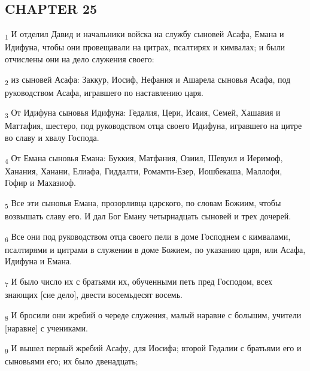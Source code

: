 \subsection{CHAPTER 25}
\begin{tcolorbox}
\textsubscript{1} И отделил Давид и начальники войска на службу сыновей Асафа, Емана и Идифуна, чтобы они провещавали на цитрах, псалтирях и кимвалах; и были отчислены они на дело служения своего:
\end{tcolorbox}
\begin{tcolorbox}
\textsubscript{2} из сыновей Асафа: Заккур, Иосиф, Нефания и Ашарела сыновья Асафа, под руководством Асафа, игравшего по наставлению царя.
\end{tcolorbox}
\begin{tcolorbox}
\textsubscript{3} От Идифуна сыновья Идифуна: Гедалия, Цери, Исаия, Семей, Хашавия и Маттафия, шестеро, под руководством отца своего Идифуна, игравшего на цитре во славу и хвалу Господа.
\end{tcolorbox}
\begin{tcolorbox}
\textsubscript{4} От Емана сыновья Емана: Буккия, Матфания, Озиил, Шевуил и Иеримоф, Ханания, Ханани, Елиафа, Гиддалти, Ромамти-Езер, Иошбекаша, Маллофи, Гофир и Махазиоф.
\end{tcolorbox}
\begin{tcolorbox}
\textsubscript{5} Все эти сыновья Емана, прозорливца царского, по словам Божиим, чтобы возвышать славу его. И дал Бог Еману четырнадцать сыновей и трех дочерей.
\end{tcolorbox}
\begin{tcolorbox}
\textsubscript{6} Все они под руководством отца своего пели в доме Господнем с кимвалами, псалтирями и цитрами в служении в доме Божием, по указанию царя, или Асафа, Идифуна и Емана.
\end{tcolorbox}
\begin{tcolorbox}
\textsubscript{7} И было число их с братьями их, обученными петь пред Господом, всех знающих [сие дело], двести восемьдесят восемь.
\end{tcolorbox}
\begin{tcolorbox}
\textsubscript{8} И бросили они жребий о череде служения, малый наравне с большим, учители [наравне] с учениками.
\end{tcolorbox}
\begin{tcolorbox}
\textsubscript{9} И вышел первый жребий Асафу, для Иосифа; второй Гедалии с братьями его и сыновьями его; их было двенадцать;
\end{tcolorbox}
